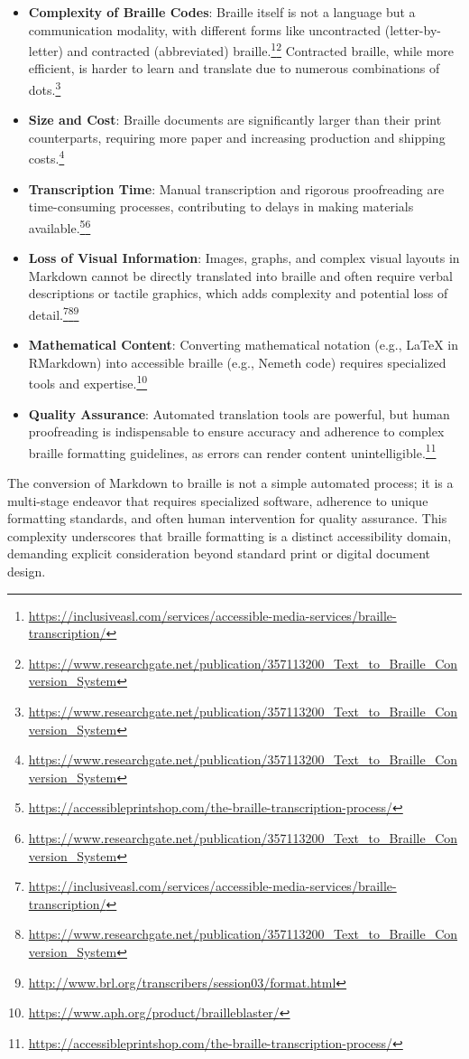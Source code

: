 \begin{itemize}[noitemsep,topsep=0pt]
    \item \textbf{Complexity of Braille Codes}: Braille itself is not a language but a communication modality, with different forms like uncontracted (letter-by-letter) and contracted (abbreviated) braille.\footnote{\url{https://inclusiveasl.com/services/accessible-media-services/braille-transcription/}}\footnote{\url{https://www.researchgate.net/publication/357113200_Text_to_Braille_Conversion_System}} Contracted braille, while more efficient, is harder to learn and translate due to numerous combinations of dots.\footnote{\url{https://www.researchgate.net/publication/357113200_Text_to_Braille_Conversion_System}}
    \item \textbf{Size and Cost}: Braille documents are significantly larger than their print counterparts, requiring more paper and increasing production and shipping costs.\footnote{\url{https://www.researchgate.net/publication/357113200_Text_to_Braille_Conversion_System}}
    \item \textbf{Transcription Time}: Manual transcription and rigorous proofreading are time-consuming processes, contributing to delays in making materials available.\footnote{\url{https://accessibleprintshop.com/the-braille-transcription-process/}}\footnote{\url{https://www.researchgate.net/publication/357113200_Text_to_Braille_Conversion_System}}
    \item \textbf{Loss of Visual Information}: Images, graphs, and complex visual layouts in Markdown cannot be directly translated into braille and often require verbal descriptions or tactile graphics, which adds complexity and potential loss of detail.\footnote{\url{https://inclusiveasl.com/services/accessible-media-services/braille-transcription/}}\footnote{\url{https://www.researchgate.net/publication/357113200_Text_to_Braille_Conversion_System}}\footnote{\url{http://www.brl.org/transcribers/session03/format.html}}
    \item \textbf{Mathematical Content}: Converting mathematical notation (e.g., LaTeX in RMarkdown) into accessible braille (e.g., Nemeth code) requires specialized tools and expertise.\footnote{\url{https://www.aph.org/product/brailleblaster/}}
    \item \textbf{Quality Assurance}: Automated translation tools are powerful, but human proofreading is indispensable to ensure accuracy and adherence to complex braille formatting guidelines, as errors can render content unintelligible.\footnote{\url{https://accessibleprintshop.com/the-braille-transcription-process/}}
\end{itemize}
The conversion of Markdown to braille is not a simple automated process; it is a multi-stage endeavor that requires specialized software, adherence to unique formatting standards, and often human intervention for quality assurance. This complexity underscores that braille formatting is a distinct accessibility domain, demanding explicit consideration beyond standard print or digital document design.

